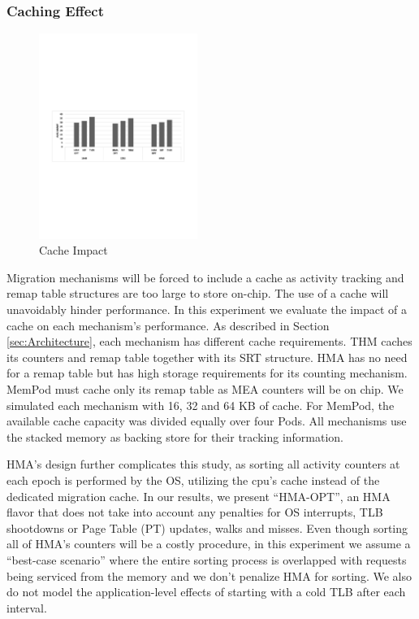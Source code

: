 \subsubsection{Caching Effect}

\begin{figure}
  \includegraphics[width=0.46\textwidth]{figures/cache_impact.pdf}
  \caption{Cache Impact}
  \label{fig:cache}
\end{figure}

Migration mechanisms will be forced to include a cache as activity tracking and remap table structures are too large to store on-chip. The use of a cache will unavoidably hinder performance. In this experiment we evaluate the impact of a cache on each mechanism's performance. As described in Section \ref{sec:Architecture}, each mechanism has different cache requirements. THM caches its counters and remap table together with its SRT structure. HMA has no need for a remap table but has high storage requirements for its counting mechanism. MemPod must cache only its remap table as MEA counters will be on chip. We simulated each mechanism with 16, 32 and 64 KB of cache. For MemPod, the available cache capacity was divided equally over four Pods. All mechanisms use the stacked memory as backing store for their tracking information.

HMA's design further complicates this study, as sorting all activity counters at each epoch is performed by the OS, utilizing the cpu's cache instead of the dedicated migration cache. In our results, we present ``HMA-OPT'', an HMA flavor that does not take into account any penalties for OS interrupts, TLB shootdowns or Page Table (PT) updates, walks and misses. Even though sorting all of HMA's counters will be a costly procedure, in this experiment we assume a ``best-case scenario'' where the entire sorting process is overlapped with requests being serviced from the memory and we don't penalize HMA for sorting. We also do not model the application-level effects of starting with a cold TLB after each interval.


